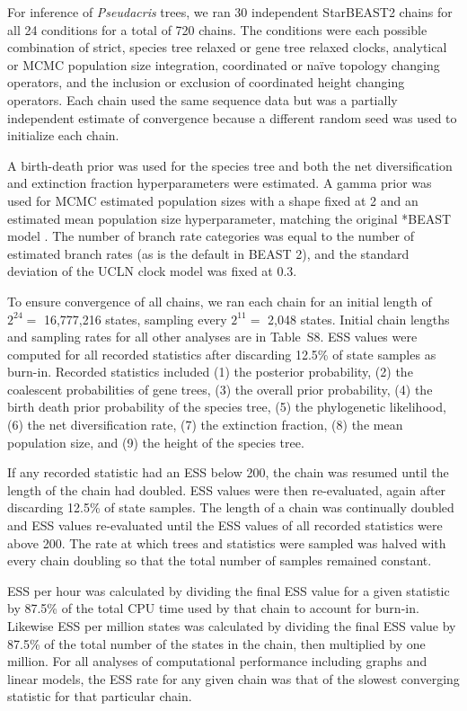 \documentclass[12pt]{article}
\begin{document}
For inference of \textit{Pseudacris} trees, we ran 30 independent StarBEAST2
chains for all 24 conditions for a total of 720 chains. The conditions were
each possible combination of strict, species tree relaxed or gene tree relaxed
clocks, analytical or MCMC population size integration, coordinated or na\"ive
topology changing operators, and the inclusion or exclusion of coordinated
height changing operators. Each chain used the same sequence data but was a
partially independent estimate of convergence because a different random seed
was used to initialize each chain.

A birth-death prior was used for the species tree and both the net
diversification and extinction fraction hyperparameters were estimated. A
gamma prior was used for MCMC estimated population sizes with a shape fixed at
2 and an estimated mean population size hyperparameter, matching the original
*BEAST model \citep{Heled01032010}. The number of branch rate categories was
equal to the number of estimated branch rates (as is the default in BEAST 2),
and the standard deviation of the UCLN clock model was fixed at 0.3.

To ensure convergence of all chains, we ran each chain for an initial length
of $2^{24} =$ 16,777,216 states, sampling every $2^{11} =$ 2,048 states. Initial
chain lengths and sampling rates for all other analyses are in Table~S8. ESS
values were computed for all recorded statistics after discarding 12.5\% of
state samples as burn-in. Recorded statistics included (1) the posterior
probability, (2) the coalescent probabilities of gene trees, (3) the overall
prior probability, (4) the birth death prior probability of the species tree,
(5) the phylogenetic likelihood, (6) the net diversification rate, (7) the
extinction fraction, (8) the mean population size, and (9) the height of the
species tree.

If any recorded statistic had an ESS below 200, the chain was resumed until
the length of the chain had doubled. ESS values were then re-evaluated, again
after discarding 12.5\% of state samples. The length of a chain was
continually doubled and ESS values re-evaluated until the ESS values of all
recorded statistics were above 200. The rate at which trees and statistics
were sampled was halved with every chain doubling so that the total number of
samples remained constant.

ESS per hour was calculated by dividing the final ESS value for a given
statistic by 87.5\% of the total CPU time used by that chain to account for
burn-in. Likewise ESS per million states was calculated by dividing the final
ESS value by 87.5\% of the total number of the states in the chain, then
multiplied by one million. For all analyses of computational performance
including graphs and linear models, the ESS rate for any given chain was that
of the slowest converging statistic for that particular chain.
\end{document}
